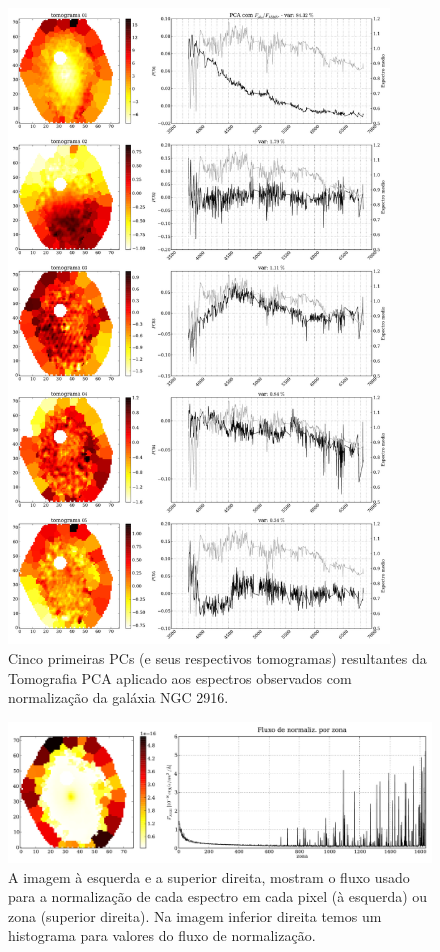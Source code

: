 \begin{figure}
    \includegraphics[width=0.9\textwidth]{figuras/K0277-tomo-obs-norm.pdf}
    \caption[Tomogramas de 1 a 5 da gal\'axia NGC 2916 - $F_{obs}$ norm.]
    {Cinco primeiras PCs (e seus respectivos tomogramas) resultantes da Tomografia PCA aplicado aos espectros
    observados com normalização da galáxia NGC 2916.}
    \label{fig:K277tomofobsnorm}
\end{figure}

\begin{figure}
    \includegraphics[width=1.\textwidth]{figuras/K0277-fobs_norm.pdf}
    \caption[Fluxos de normalização para cada zona da galáxia K0277.]
    {A imagem à esquerda e a superior direita, mostram o fluxo usado para a normalização de cada espectro em
    cada pixel (à esquerda) ou zona (superior direita). Na imagem inferior direita temos um histograma para valores do
    fluxo de normalização.}
    \label{fig:K277fobsnorm}
\end{figure}

